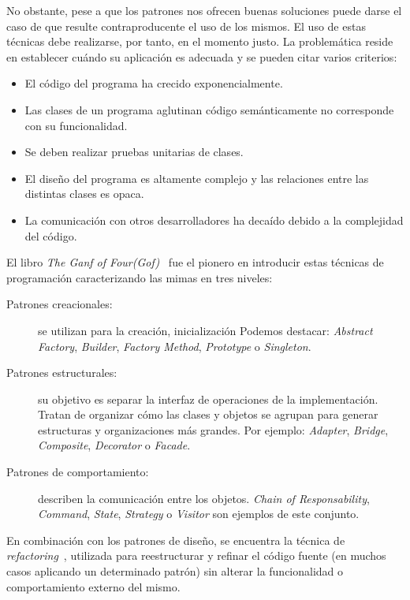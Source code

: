 No obstante, pese a que los patrones nos ofrecen buenas soluciones puede darse el caso de que 
resulte contraproducente el uso de los mismos. El uso de estas técnicas debe realizarse, 
por tanto, en el momento justo. La problemática reside en establecer cuándo su aplicación 
es adecuada y se pueden citar varios criterios:
\begin{itemize}
    \item El código del programa ha crecido exponencialmente.
    \item Las clases de un programa aglutinan código semánticamente no corresponde con su funcionalidad.
    \item Se deben realizar pruebas unitarias de clases.
    \item El diseño del programa es altamente complejo y las relaciones entre las distintas 
clases es opaca.
   \item La comunicación con otros desarrolladores ha decaído debido a la complejidad del código.
\end{itemize}

El libro \textit{The Ganf of Four(Gof)}~\cite{Gamma} fue el pionero en introducir estas técnicas de 
programación caracterizando las mimas en tres niveles:
\begin{description}
    \item [Patrones creacionales:]se utilizan para la creación, inicialización
    Podemos destacar: \textit{Abstract Factory}, \textit{Builder}, \textit{Factory Method}, \textit{Prototype} o
    \textit{Singleton}.
    \item [Patrones estructurales:]su objetivo es separar la interfaz de
    operaciones de la implementación. Tratan de organizar cómo las clases y
    objetos se agrupan para generar estructuras y organizaciones más grandes.
    Por ejemplo: \textit{Adapter}, \textit{Bridge}, \textit{Composite}, \textit{Decorator} o \textit{Facade}.
    \item [Patrones de comportamiento:] describen la comunicación entre los
    objetos.  \textit{Chain of Responsability}, \textit{Command}, \textit{State}, \textit{Strategy} o \textit{Visitor} son
    ejemplos de este conjunto.
\end{description}

En combinación con los patrones de diseño, se encuentra la técnica de \textit{refactoring}~\cite{Fowler1999}, 
utilizada para reestructurar y refinar el código fuente (en muchos casos aplicando un determinado patrón) 
sin alterar la funcionalidad o comportamiento externo del mismo.



